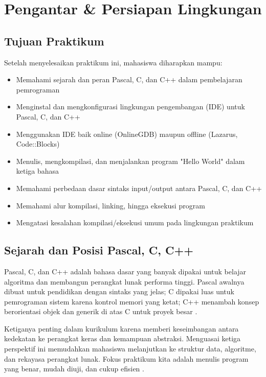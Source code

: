 \documentclass[../main.tex]{subfiles}
\begin{document}
\chapter{Pengantar \& Persiapan Lingkungan}

\section*{Tujuan Praktikum}
Setelah menyelesaikan praktikum ini, mahasiswa diharapkan mampu:
\begin{itemize}
  \item Memahami sejarah dan peran Pascal, C, dan C++ dalam pembelajaran pemrograman
  \item Menginstal dan mengkonfigurasi lingkungan pengembangan (IDE) untuk Pascal, C, dan C++
  \item Menggunakan IDE baik online (OnlineGDB) maupun offline (Lazarus, Code::Blocks)
  \item Menulis, mengkompilasi, dan menjalankan program "Hello World" dalam ketiga bahasa
  \item Memahami perbedaan dasar sintaks input/output antara Pascal, C, dan C++
  \item Memahami alur kompilasi, linking, hingga eksekusi program \parencite{gnu-c-manual,free-pascal-docs}
  \item Mengatasi kesalahan kompilasi/eksekusi umum pada lingkungan praktikum
\end{itemize}

\section{Sejarah dan Posisi Pascal, C, C++}
Pascal, C, dan C++ adalah bahasa dasar yang banyak dipakai untuk belajar algoritma dan membangun perangkat lunak performa tinggi. Pascal awalnya dibuat untuk pendidikan dengan sintaks yang jelas; C dipakai luas untuk pemrograman sistem karena kontrol memori yang ketat; C++ menambah konsep berorientasi objek dan generik di atas C untuk proyek besar \parencite{pascal-tutorial-wikibooks,gnu-c-manual,cpp-reference}.

Ketiganya penting dalam kurikulum karena memberi keseimbangan antara kedekatan ke perangkat keras dan kemampuan abstraksi. Menguasai ketiga perspektif ini memudahkan mahasiswa melanjutkan ke struktur data, algoritme, dan rekayasa perangkat lunak. Fokus praktikum kita adalah menulis program yang benar, mudah diuji, dan cukup efisien \parencite{free-pascal-docs,gnu-c-manual,cpp-reference}.
\end{document}
